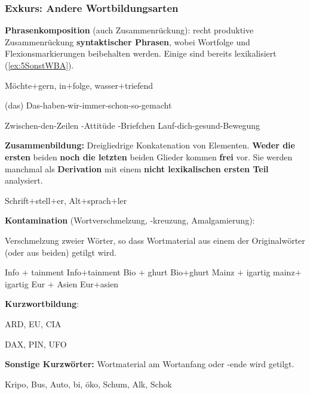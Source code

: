 \begin{frame}
\frametitle{Exkurs: Andere Wortbildungsarten}

\textbf{Phrasenkomposition} (auch Zusammenrückung): recht produktive Zusammenrückung \textbf{syntaktischer Phrasen}, wobei Wortfolge und Flexionsmarkierungen beibehalten werden. Einige sind bereits lexikalisiert (\ref{ex:5SonstWBA}).

\settowidth{} 	
\ea \label{ex:5SonstWBA} Möchte$+$gern, in$+$folge, wasser$+$triefend

\ex \label{ex:5PKomp0}
\ea (das) Das-haben-wir-immer-schon-so-gemacht

\ex Zwischen-den-Zeilen -Attitüde
\ex {}-Briefchen
\ex Lauf-dich-gesund-Bewegung 		
\z
\z


\pause 


\textbf{Zusammenbildung:} Dreigliedrige Konkatenation von Elementen. \textbf{Weder die ersten} beiden \textbf{noch die letzten} beiden Glieder kommen \textbf{frei} vor. Sie werden manchmal als \textbf{Derivation} mit einem \textbf{nicht lexikalischen ersten Teil} analysiert.

\ea Schrift$+$stell$+$er, Alt$+$sprach$+$ler
\ex 
{}
\z 
\z


\end{frame}


\begin{frame}


\textbf{Kontamination} (Wortverschmelzung, -kreuzung, Amalgamierung):

Verschmelzung zweier Wörter, so dass Wortmaterial aus einem der Originalwörter (oder aus beiden) getilgt wird.

\ea 
\ea Info $+$ tainment \ras Info$+$tainment
\ex Bio $+$ ghurt \ras Bio$+$ghurt 
\ex Mainz $+$ igartig \ras mainz$+$igartig
\ex Eur $+$ Asien \ras Eur$+$asien
\z 
\z


\medskip
\pause 


\textbf{Kurzwortbildung}:

\settowidth{} 
\ea ARD, EU, CIA
\z

\ea DAX, PIN, UFO
\z


\medskip


\textbf{Sonstige Kurzwörter:} Wortmaterial am Wortanfang oder -ende wird getilgt.

\ea Kripo, Bus, Auto, bi, öko, Schum, Alk, Schok
\z

\end{frame}



